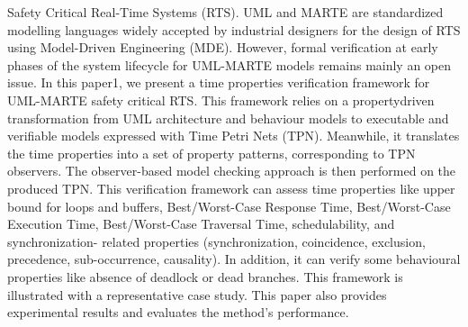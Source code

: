 \documentclass{article}
\begin{document}
	
	Safety Critical Real-Time Systems (RTS). UML and MARTE are standardized
	modelling languages widely accepted by industrial designers for
	the design of RTS using Model-Driven Engineering (MDE). However, formal
	verification at early phases of the system lifecycle for UML-MARTE
	models remains mainly an open issue.
	In this paper1, we present a time properties verification framework for
	UML-MARTE safety critical RTS. This framework relies on a propertydriven
	transformation from UML architecture and behaviour models to
	executable and verifiable models expressed with Time Petri Nets (TPN).
	Meanwhile, it translates the time properties into a set of property patterns,
	corresponding to TPN observers. The observer-based model checking
	approach is then performed on the produced TPN. This verification
	framework can assess time properties like upper bound for loops and
	buffers, Best/Worst-Case Response Time, Best/Worst-Case Execution
	Time, Best/Worst-Case Traversal Time, schedulability, and synchronization-
	related properties (synchronization, coincidence, exclusion, precedence,
	sub-occurrence, causality). In addition, it can verify some behavioural
	properties like absence of deadlock or dead branches. This
	framework is illustrated with a representative case study. This paper also
	provides experimental results and evaluates the method’s performance.
	\cite{Time Properties Verification Framework for
		UML-MARTE Safety Critical Real-Time Systems}
	
\end{document}
